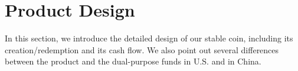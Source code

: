 \documentclass[draft, noinfoline]{ectaart}
\numberwithin{equation}{section}
\theoremstyle{plain}
\begin{document}







\section{Product Design}\label{sec:Product-Design}
In this section, we introduce the detailed design of our stable coin, including its creation/redemption and its cash flow. We also point out several differences between the product and the dual-purpose funds in U.S. and in China.
\end{document}
